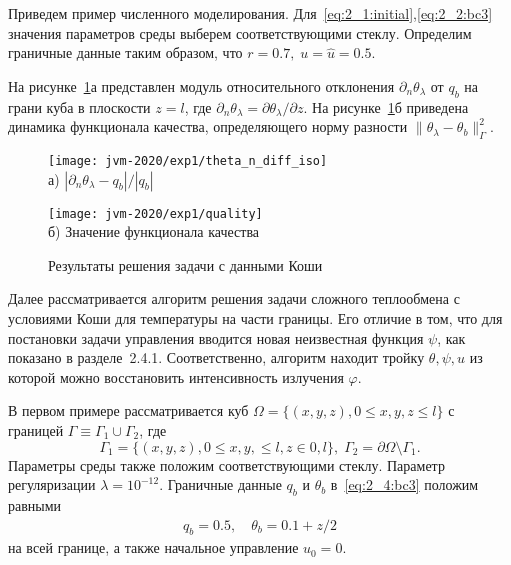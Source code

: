 Приведем пример численного моделирования.
Для~\eqref{eq:2_1:initial},\eqref{eq:2_2:bc3} значения параметров
среды выберем соответствующими стеклу.
Определим граничные данные таким образом, что $r = 0.7,\; u = \hat u = 0.5$.

На рисунке~\ref{fig:4_4:0}а представлен модуль относительного
отклонения $\partial_n\theta_\lambda$ от $q_b$ на грани куба в плоскости $z=l$,
где $\partial_n\theta_\lambda=\partial\theta_\lambda/\partial z$.
На рисунке~\ref{fig:4_4:0}б приведена динамика функционала качества, определяющего норму
разности $\|\theta_\lambda -\theta_b\|^2_\Gamma$.
\begin{figure}[h!t]
    \begin{minipage}[b][][b]{0.49\linewidth}
        \centering
        \texttt{[image: jvm-2020/exp1/theta\_n\_diff\_iso]}
        \\ а) $|\partial_n\theta_\lambda-q_b|/|q_b|$
    \end{minipage}
    \hfill
    \begin{minipage}[b][][b]{0.49\linewidth}
        \centering
        \texttt{[image: jvm-2020/exp1/quality]}
        \\ б) Значение функционала качества
    \end{minipage}
    \caption{Результаты решения задачи с данными Коши}
    \label{fig:4_4:0}
\end{figure}


Далее рассматривается алгоритм решения задачи сложного теплообмена с условиями Коши для
температуры на части границы.
Его отличие в том, что для постановки задачи управления вводится новая неизвестная функция $\psi$,
как показано в разделе~2.4.1.
Соответственно, алгоритм находит тройку $\theta, \psi, u$ из которой можно
восстановить интенсивность излучения $\varphi$.


В первом примере рассматривается куб $\Omega = \{ (x, y, z), 0 \leq x,y,z \leq l \}$ с границей
$\Gamma \equiv \Gamma_1 \cup \Gamma_2$, где
\[
    \Gamma_1 = \{(x, y, z), 0 \leq x,y, \leq l, z \in 0, l\}, \;
    \Gamma_2 = \partial \Omega \setminus \Gamma_1.
\]
Параметры среды также положим соответствующими стеклу.
Параметр регуляризации $\lambda=10^{-12}$.
Граничные данные $q_b$ и $\theta_b$ в~\eqref{eq:2_4:bc3} положим равными
\begin{gather*}
    q_b = 0.5, \quad
    \theta_b = 0.1 + z/2
\end{gather*}
на всей границе, а также начальное управление $u_0 = 0$.


